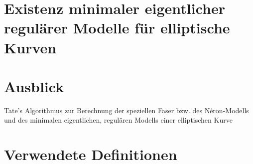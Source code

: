 \documentclass[german]{scrreprt}
\begin{document}
\chapter{Existenz minimaler eigentlicher regulärer Modelle für
  elliptische Kurven}

\chapter{Ausblick}
Tate's Algorithmus zur Berechnung der speziellen Faser bzw. des
Néron-Modells und des minimalen eigentlichen, regulären Modells einer
elliptischen Kurve
\cite[IV.9]{silverman2}

\appendix
\chapter{Verwendete Definitionen}
\end{document}
